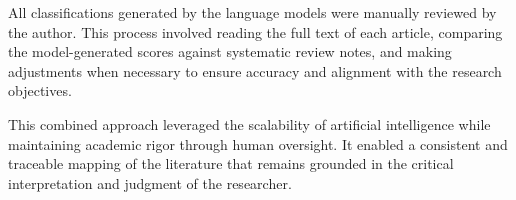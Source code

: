 All classifications generated by the language models were manually reviewed by the author. This process involved reading the full text of each article, comparing the model-generated scores against systematic review notes, and making adjustments when necessary to ensure accuracy and alignment with the research objectives.

This combined approach leveraged the scalability of artificial intelligence while maintaining academic rigor through human oversight. It enabled a consistent and traceable mapping of the literature that remains grounded in the critical interpretation and judgment of the researcher.
